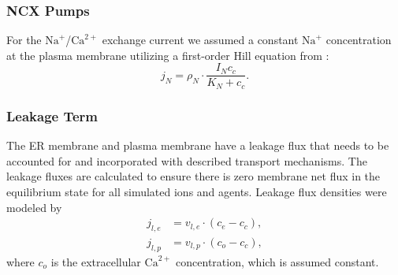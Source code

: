 \documentclass[12pt]{article}
\begin{document}
\subsubsection*{NCX Pumps} For the $\textrm{Na}^{+}$/$\textrm{Ca}^{2+}$ exchange current we assumed a constant $\textrm{Na}^{+}$ concentration at the plasma membrane utilizing a first-order Hill equation from \cite{Graupner2003,Graupner2005}:
\begin{equation}
    j_N=\rho_N\cdot\frac{I_Nc_c}{K_N+c_c}.
\end{equation}
\subsubsection*{Leakage Term} The ER membrane and plasma membrane have a leakage flux that needs to be accounted for and incorporated with described transport mechanisms. The leakage fluxes are calculated to ensure there is zero membrane net flux in the equilibrium state for all simulated ions and agents. Leakage flux densities were modeled by 
\begin{align*}
    j_{l,e}&=v_{l,e}\cdot(c_e-c_c),\\
    j_{l,p}&=v_{l,p}\cdot(c_o-c_c),
\end{align*}
where $c_o$ is the extracellular $\textrm{Ca}^{2+}$ concentration, which is assumed constant. 
\end{document}
